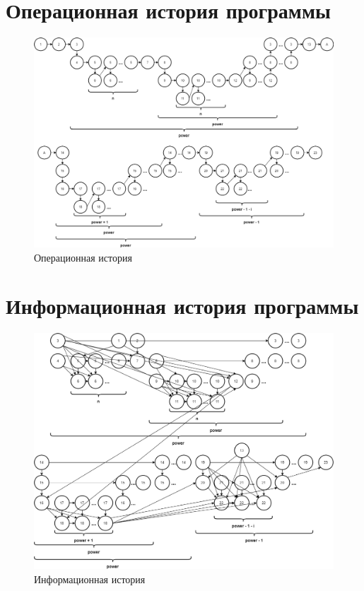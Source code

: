 \documentclass[12pt]{report}
\begin{document}
\section{Операционная история программы}

\begin{figure}[H]
	\centering
	\includegraphics[scale=0.46]{OI.png}
	\caption{Операционная история}
	\label{OI}
\end{figure}

\section{Информационная история программы}

\begin{figure}[H]
	\centering
	\includegraphics[scale=0.525]{II.png}
	\caption{Информационная история}
	\label{II}
\end{figure}
\end{document}
